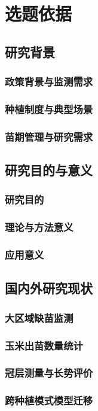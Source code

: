 \chapter{选题依据}

\section{研究背景}
\subsection{政策背景与监测需求}

\subsection{种植制度与典型场景}

\subsection{苗期管理与研究需求}

\section{研究目的与意义}
\subsection{研究目的}

\subsection{理论与方法意义}

\subsection{应用意义}

\section{国内外研究现状}
\subsection{大区域缺苗监测}

\subsection{玉米出苗数量统计}

\subsection{冠层测量与长势评价}

\subsection{跨种植模式模型迁移}
